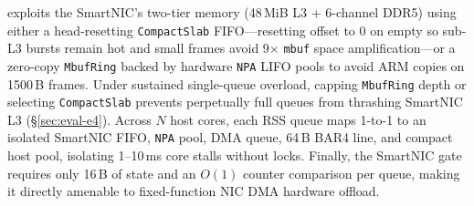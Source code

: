 \sys{} exploits the SmartNIC's two-tier memory (48\,MiB L3 + 6-channel DDR5)
using either a head-resetting \texttt{CompactSlab} FIFO---resetting offset to 0
on empty so sub-L3 bursts remain hot and small frames avoid 9$\times$
\texttt{mbuf} space amplification---or a zero-copy \texttt{MbufRing} backed by
hardware \texttt{NPA} LIFO pools to avoid ARM copies on 1500\,B frames. Under
sustained single-queue overload, capping \texttt{MbufRing} depth or selecting
\texttt{CompactSlab} prevents perpetually full queues from thrashing SmartNIC
L3 (\S\ref{sec:eval-e4}). Across $N$ host cores, each RSS queue maps 1-to-1 to
an isolated SmartNIC FIFO, \texttt{NPA} pool, DMA queue, 64\,B BAR4 line, and
compact host pool, isolating 1--10\,ms core stalls without locks. Finally, the
SmartNIC gate requires only 16\,B of state and an $O(1)$ counter comparison per
queue, making it directly amenable to fixed-function NIC DMA hardware offload.
